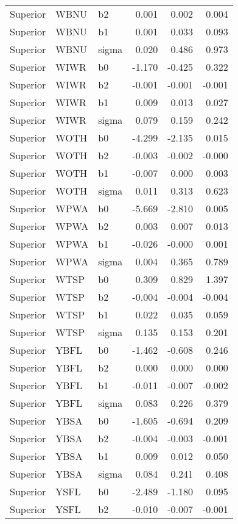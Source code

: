 \begin{table}[ht]
\begin{center}
\begin{tabular}{lllrrr}
  Superior & WBNU & b2 & 0.001 & 0.002 & 0.004 \\ 
  Superior & WBNU & b1 & 0.001 & 0.033 & 0.093 \\ 
  Superior & WBNU & sigma & 0.020 & 0.486 & 0.973 \\ 
  Superior & WIWR & b0 & -1.170 & -0.425 & 0.322 \\ 
  Superior & WIWR & b2 & -0.001 & -0.001 & -0.001 \\ 
  Superior & WIWR & b1 & 0.009 & 0.013 & 0.027 \\ 
  Superior & WIWR & sigma & 0.079 & 0.159 & 0.242 \\ 
  Superior & WOTH & b0 & -4.299 & -2.135 & 0.015 \\ 
  Superior & WOTH & b2 & -0.003 & -0.002 & -0.000 \\ 
  Superior & WOTH & b1 & -0.007 & 0.000 & 0.003 \\ 
  Superior & WOTH & sigma & 0.011 & 0.313 & 0.623 \\ 
  Superior & WPWA & b0 & -5.669 & -2.810 & 0.005 \\ 
  Superior & WPWA & b2 & 0.003 & 0.007 & 0.013 \\ 
  Superior & WPWA & b1 & -0.026 & -0.000 & 0.001 \\ 
  Superior & WPWA & sigma & 0.004 & 0.365 & 0.789 \\ 
  Superior & WTSP & b0 & 0.309 & 0.829 & 1.397 \\ 
  Superior & WTSP & b2 & -0.004 & -0.004 & -0.004 \\ 
  Superior & WTSP & b1 & 0.022 & 0.035 & 0.059 \\ 
  Superior & WTSP & sigma & 0.135 & 0.153 & 0.201 \\ 
  Superior & YBFL & b0 & -1.462 & -0.608 & 0.246 \\ 
  Superior & YBFL & b2 & 0.000 & 0.000 & 0.000 \\ 
  Superior & YBFL & b1 & -0.011 & -0.007 & -0.002 \\ 
  Superior & YBFL & sigma & 0.083 & 0.226 & 0.379 \\ 
  Superior & YBSA & b0 & -1.605 & -0.694 & 0.209 \\ 
  Superior & YBSA & b2 & -0.004 & -0.003 & -0.001 \\ 
  Superior & YBSA & b1 & 0.009 & 0.012 & 0.050 \\ 
  Superior & YBSA & sigma & 0.084 & 0.241 & 0.408 \\ 
  Superior & YSFL & b0 & -2.489 & -1.180 & 0.095 \\ 
  Superior & YSFL & b2 & -0.010 & -0.007 & -0.001 \\ 

\end{tabular}
\end{center}
\end{table}
